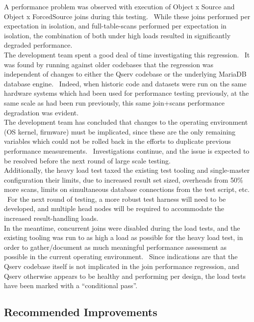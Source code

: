 \documentclass[DM,lsstdraft,STR,toc]{lsstdoc}
\begin{document}
A performance problem was observed with execution of Object x Source and
Object x ForcedSource joins during this testing. ~While these joins
performed per expectation in isolation, and full-table-scans performed
per expectation in isolation, the combination of both under high loads
resulted in significantly degraded performance.\\[2\baselineskip]The
development team spent a good deal of time investigating this
regression. ~It was found by running against older codebases that the
regression was independent of changes to either the Qserv codebase or
the underlying MariaDB database engine. ~Indeed, when historic code and
datasets were run on the same hardware systems which had been used for
performance testing previously, at the same scale as had been run
previously, this same join+scans performance degradation was
evident.\\[2\baselineskip]The development team has concluded that
changes to the operating environment (OS kernel, firmware) must be
implicated, since these are the only remaining variables which could not
be rolled back in the efforts to duplicate previous performance
measurements. ~Investigations continue, and the issue is expected to be
resolved before the next round of large scale
testing.\\[2\baselineskip]Additionally, the heavy load test taxed the
existing test tooling and single-master configuration their limits, due
to increased result set sized, overheads from 50\% more scans, limits on
simultaneous database connections from the test script, etc. ~For the
next round of testing, a more robust test harness will need to be
developed, and multiple head nodes will be required to accommodate the
increased result-handling loads.\\[2\baselineskip]In the meantime,
concurrent joins were disabled during the load tests, and the existing
tooling was run to as high a load as possible for the heavy load test,
in order to gather/document as much meaningful performance assessment as
possible in the current operating environment. ~Since indications are
that the Qserv codebase itself is not implicated in the join performance
regression, and Qserv otherwise appears to be healthy and performing per
design, the load tests have been marked with a ``conditional pass''.


\subsection{Recommended Improvements}
\label{sect:recommendations}
\end{document}
